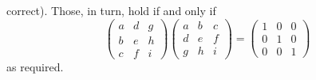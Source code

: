 \begin{exercises}
\begin{answer}
      correct).
      Those, in turn, hold if and only if 
      \begin{equation*}
        \begin{pmatrix}
          a &d &g \\
          b &e &h \\
          c &f &i
        \end{pmatrix}
        \begin{pmatrix}
          a &b &c  \\
          d &e &f  \\
          g &h &i
        \end{pmatrix}
        =
        \begin{pmatrix}
          1 &0 &0  \\
          0 &1 &0  \\
          0 &0 &1
        \end{pmatrix}
      \end{equation*}
      as required.


\end{answer}
\end{exercises}
